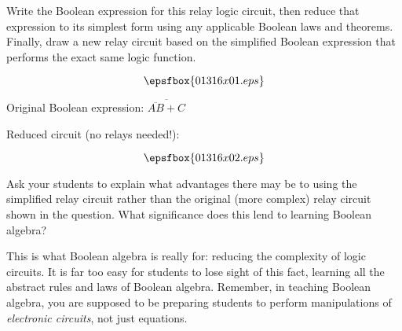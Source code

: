 

Write the Boolean expression for this relay logic circuit, then reduce that expression to its simplest form using any applicable Boolean laws and theorems.  Finally, draw a new relay circuit based on the simplified Boolean expression that performs the exact same logic function.

$$\epsfbox{01316x01.eps}$$







Original Boolean expression: $\overline{\overline{AB} + C}$

\vskip 10pt

Reduced circuit (no relays needed!):

$$\epsfbox{01316x02.eps}$$







Ask your students to explain what advantages there may be to using the simplified relay circuit rather than the original (more complex) relay circuit shown in the question.  What significance does this lend to learning Boolean algebra?

This is what Boolean algebra is really for: reducing the complexity of logic circuits.  It is far too easy for students to lose sight of this fact, learning all the abstract rules and laws of Boolean algebra.  Remember, in teaching Boolean algebra, you are supposed to be preparing students to perform manipulations of {\it electronic circuits}, not just equations.




